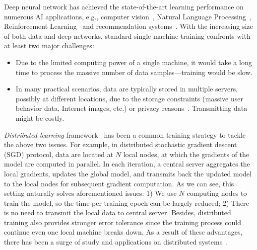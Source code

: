 \documentclass[11pt]{article}
\begin{document}
Deep neural network has achieved the state-of-the-art learning performance on numerous AI applications, e.g., computer vision~\cite{Proc:GAN_NIPS14,Proc:Resnet_CVPR16,CV_review18}, Natural Language Processing~\cite{Proc:Graves_ICASSP13,NLP_review18,sentiment_review18}, Reinforcement Learning~\cite{Arxiv:MnihKSGAWR13,AlphaGo_17} and recommendation systems~\cite{Proc:Covington_2016,Article:Wei_2017}. With the increasing size of both data and deep networks, standard single machine training confronts with at least two major challenges:
\begin{itemize}
    \item Due to the limited computing power of a single machine, it would take a long time to process the massive number of data samples---training would be slow.
  
    \item In many practical scenarios, data are typically stored in multiple servers, possibly at different locations, due to the storage constraints (massive user behavior data, Internet images, etc.) or privacy reasons~\cite{Proc:Chang18}. Transmitting data might be costly.
\end{itemize}
\textit{Distributed learning} framework~\cite{Proc:Dean_NIPS12} has been a common training strategy to tackle the above two issues. For example, in distributed stochastic gradient descent (SGD) protocol, data are located at $N$ local nodes, at which the gradients of the model are computed in parallel. In each iteration, a central server aggregates the local gradients, updates the global model, and transmits back the updated model to the local nodes for subsequent gradient computation. As we can see, this setting naturally solves aforementioned issues: 1) We use $N$ computing nodes to train the model, so the time per training epoch can be largely reduced; 2) There is no need to transmit the local data to central server. Besides, distributed training also provides stronger error tolerance since the training process could continue even one local machine breaks down. As a result of these advantages, there has been a surge of study and applications on distributed systems~\cite{boyd2011distributed,nedic2009distributed,duchi2011dual,Arxiv:Goyal17,hong2017prox,lu2019gnsd,koloskova2019decentralized}.
\end{document}
